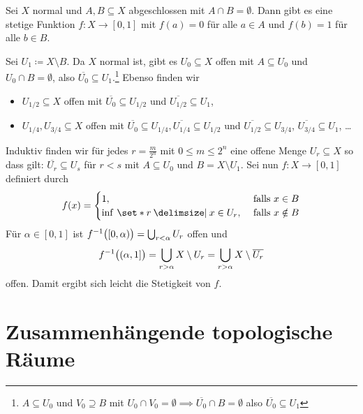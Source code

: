 \begin{lemma}[{name=[Urysohn]},label=lem:urysohn]
	Sei $X$ normal und $A,B \subseteq X$ abgeschlossen mit $A \cap B = \emptyset$. 
	Dann gibt es eine stetige Funktion $f \colon X \to [0,1]$ mit $f(a) = 0$ für alle $a \in A$ und $f(b)= 1$ für alle $b \in B$.
\end{lemma}
\begin{beweis}
	Sei $U_1 \coloneqq X \setminus B$. 
	Da $X$ normal ist, gibt es $U_0 \subseteq X$ offen mit $A \subseteq U_0$ und $U_0 \cap B = \emptyset$, also $\overline{U_0} \subseteq U_1$.\footnote{$A \subseteq U_0$ und $V_0 \supseteq B$ mit $U_0 \cap V_0 = \emptyset \implies \overline{U_0} \cap B = \emptyset $ also $\overline{U_0} \subseteq U_1$}
	Ebenso finden wir 
	\begin{itemize}
		\item $U_{1/2} \subseteq X$ offen mit $\overline{U_0} \subseteq U_{1/2}$ und $\overline{U_{1/2}} \subseteq U_1$,
		\item $U_{1/4}, U_{3/4} \subseteq X$ offen mit 
		$\overline{U_0} \subseteq U_{1/4}, \overline{U_{1/4}} \subseteq U_{1/2}$ und $ \overline{U_{1/2}} \subseteq U_{3/4} $, $\overline{U_{3/4}} \subseteq U_1 $, \ldots
	\end{itemize}
	Induktiv finden wir für jedes $r = \frac{m}{2^n} $ mit $0 \le m \le 2^n$ eine offene Menge $U_r \subseteq X$ so dass gilt: 
	$\overline{U_r} \subseteq U_s $ für $r < s$ mit $A \subseteq U_0$ und $B= X \setminus U_1$. 
	Sei nun $f \colon X \to [0,1]$ definiert durch
	\[
		f(x) = \begin{cases}
			1, &\text{ falls }x \in B\\
			\inf \,\set*{r \given x \in U_r} , &\text{ falls } x \notin B
		\end{cases}
	\]
	Für $\alpha\in [0,1]$ ist $f ^{-1}\enbrace[\big]{[0,\alpha)} = \bigcup_{r <\alpha} U_r$ offen und 
	\[
		f ^{-1} \enbrace[\big]{(\alpha,1]} = \bigcup_{r > \alpha} X \setminus U_r = \bigcup_{r > \alpha} X  \setminus \overline{U_r} 
	\]
	offen. Damit ergibt sich leicht die Stetigkeit von $f$.
\end{beweis}

\newpage
\section{Zusammenhängende topologische Räume} %
\label{sec:zusammenhangende_topologische_raume}

